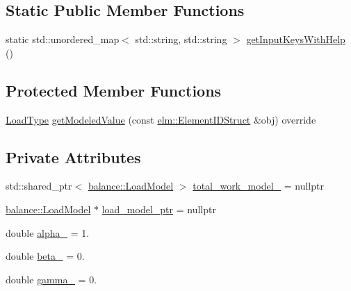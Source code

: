 \subsection*{Static Public Member Functions}
\begin{DoxyCompactItemize}
\item 
static std\+::unordered\+\_\+map$<$ std\+::string, std\+::string $>$ \hyperlink{structvt_1_1vrt_1_1collection_1_1lb_1_1_tempered_w_min_a30e2c27a7d127db53f268916fe8cbee2}{get\+Input\+Keys\+With\+Help} ()
\end{DoxyCompactItemize}
\subsection*{Protected Member Functions}
\begin{DoxyCompactItemize}
\item 
\hyperlink{namespacevt_a8fb51741340b87d7aaee0bef60e9896b}{Load\+Type} \hyperlink{structvt_1_1vrt_1_1collection_1_1lb_1_1_tempered_w_min_a25aefd21d684caa298791567c9d78603}{get\+Modeled\+Value} (const \hyperlink{structvt_1_1elm_1_1_element_i_d_struct}{elm\+::\+Element\+I\+D\+Struct} \&obj) override
\end{DoxyCompactItemize}
\subsection*{Private Attributes}
\begin{DoxyCompactItemize}
\item 
std\+::shared\+\_\+ptr$<$ \hyperlink{structvt_1_1vrt_1_1collection_1_1balance_1_1_load_model}{balance\+::\+Load\+Model} $>$ \hyperlink{structvt_1_1vrt_1_1collection_1_1lb_1_1_tempered_w_min_a823e9f6adf5517ee65be8e32ca50b139}{total\+\_\+work\+\_\+model\+\_\+} = nullptr
\item 
\hyperlink{structvt_1_1vrt_1_1collection_1_1balance_1_1_load_model}{balance\+::\+Load\+Model} $\ast$ \hyperlink{structvt_1_1vrt_1_1collection_1_1lb_1_1_tempered_w_min_a02400fd847cdebdf68d733e166b34cfd}{load\+\_\+model\+\_\+ptr} = nullptr
\item 
double \hyperlink{structvt_1_1vrt_1_1collection_1_1lb_1_1_tempered_w_min_a3c73a78b96830428d3f87b5f930ebef5}{alpha\+\_\+} = 1.
\item 
double \hyperlink{structvt_1_1vrt_1_1collection_1_1lb_1_1_tempered_w_min_abce8c16e0a7656a9df933f54ce7d2256}{beta\+\_\+} = 0.
\item 
double \hyperlink{structvt_1_1vrt_1_1collection_1_1lb_1_1_tempered_w_min_abfdd0a558d47f9e31f8645fc703479db}{gamma\+\_\+} = 0.
\end{DoxyCompactItemize}
